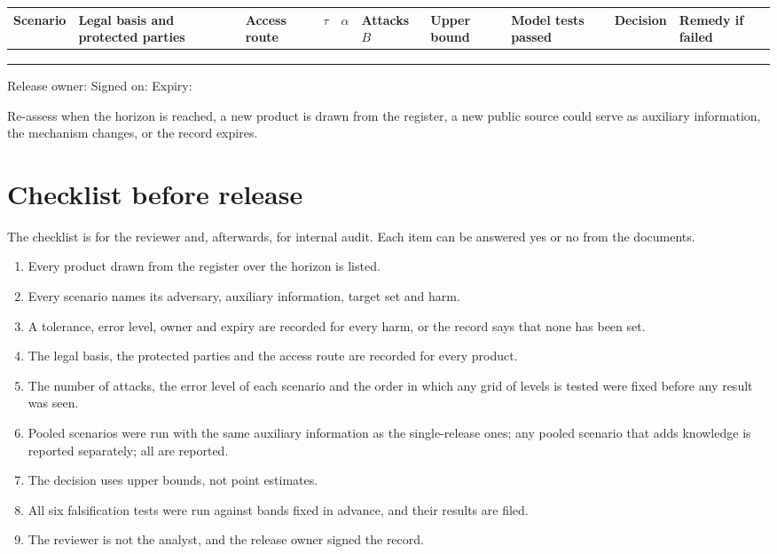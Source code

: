\begin{center}
\footnotesize
\setlength{\tabcolsep}{2.5pt}
\begin{tabular}{@{}>{\raggedright\arraybackslash}p{1.5cm}>{\raggedright\arraybackslash}p{1.8cm}>{\raggedright\arraybackslash}p{1.3cm}>{\raggedright\arraybackslash}p{0.6cm}>{\raggedright\arraybackslash}p{0.6cm}>{\raggedright\arraybackslash}p{1.1cm}>{\raggedright\arraybackslash}p{1.5cm}>{\raggedright\arraybackslash}p{1.6cm}>{\raggedright\arraybackslash}p{1.6cm}>{\raggedright\arraybackslash}p{1.4cm}@{}}
\toprule
Scenario & Legal basis and protected parties & Access route & $\tau$ & $\alpha$ &
Attacks $B$ & Upper bound & Model tests passed & Decision & Remedy if
failed \\
\midrule
 & & & & & & & & & \\[12pt]
 & & & & & & & & & \\[12pt]
 & & & & & & & & & \\[12pt]
\bottomrule
\end{tabular}
\end{center}
\noindent Release owner: \hrulefill\quad Signed on: \hrulefill\quad Expiry:
\hrulefill

\noindent Re-assess when the horizon is reached, a new product is drawn from the
register, a new public source could serve as auxiliary information, the mechanism
changes, or the record expires.

\section{Checklist before release}

The checklist is for the reviewer and, afterwards, for internal audit. Each item can
be answered yes or no from the documents.

\begin{enumerate}
\item Every product drawn from the register over the horizon is listed.
\item Every scenario names its adversary, auxiliary information, target set and harm.
\item A tolerance, error level, owner and expiry are recorded for every harm, or the
record says that none has been set.
\item The legal basis, the protected parties and the access route are recorded for
every product.
\item The number of attacks, the error level of each scenario and the order in which
any grid of levels is tested were fixed before any result was seen.
\item Pooled scenarios were run with the same auxiliary information as the
single-release ones; any pooled scenario that adds knowledge is reported separately;
all are reported.
\item The decision uses upper bounds, not point estimates.
\item All six falsification tests were run against bands fixed in advance, and their
results are filed.
\item The reviewer is not the analyst, and the release owner signed the record.
\end{enumerate}


